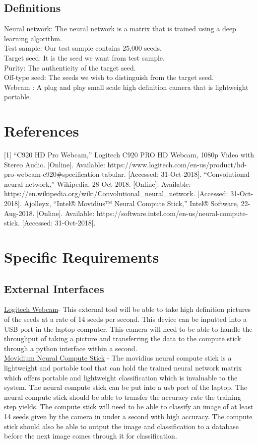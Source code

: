 \documentclass[onecolumn, draftclsnofoot,10pt, compsoc]{IEEEtran}
\begin{document}
\subsection{Definitions}
Neural network: The neural network is a matrix that is trained using a deep learning algorithm. \\
Test sample: Our test sample contains 25,000 seeds. \\
Target seed: It is the seed we want from test sample. \\
Purity: The authenticity of the target seed. \\
Off-type seed: The seeds we wish to distinguish from the target seed. \\
Webcam : A plug and play small scale high definition camera that is lightweight portable. 


\section{References}
[1] “C920 HD Pro Webcam,” Logitech C920 PRO HD Webcam, 1080p Video with Stereo Audio. [Online]. Available: https://www.logitech.com/en-us/product/hd-pro-webcam-c920\#specification-tabular. [Accessed: 31-Oct-2018]. \newline
[2] “Convolutional neural network,” Wikipedia, 28-Oct-2018. [Online]. Available: https://en.wikipedia.org/wiki/Convolutional\_neural\_network. [Accessed: 31-Oct-2018]. \newline
[3] Ajolleyx, “Intel® Movidius™ Neural Compute Stick,” Intel® Software, 22-Aug-2018. [Online]. Available: https://software.intel.com/en-us/neural-compute-stick. [Accessed: 31-Oct-2018].

\section{Specific Requirements}
\subsection{External Interfaces}
\underline{Logitech Webcam}- This external tool will be able to take high definition pictures of the seeds at a rate of 14 seeds per second. This device can be inputted into a USB port in the laptop computer. This camera will need to be able to handle the throughput of taking a picture and transferring the data to the compute stick through a python interface within a second. \\
\underline{Movidium Neural Compute Stick} - The movidius neural compute stick is a lightweight and portable tool that can hold the trained neural network matrix which offers portable and lightweight classification which is invaluable to the system. The neural compute stick can be put into a usb port of the laptop. The neural compute stick should be able to transfer the accuracy rate the training step yields. The compute stick will need to be able to classify an image of at least 14 seeds given by the camera in under a second with high accuracy. The compute stick should also be able to output the image and classification to a database before the next image comes through it for classification. 
\end{document}
